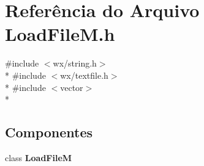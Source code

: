 \section{Referência do Arquivo Load\+File\+M.\+h}
\label{_load_file_m_8h}
{\ttfamily \#include $<$wx/string.\+h$>$}\\*
{\ttfamily \#include $<$wx/textfile.\+h$>$}\\*
{\ttfamily \#include $<$vector$>$}\\*
\subsection*{Componentes}
\begin{DoxyCompactItemize}
\item 
class {\bf Load\+FileM}
\end{DoxyCompactItemize}
